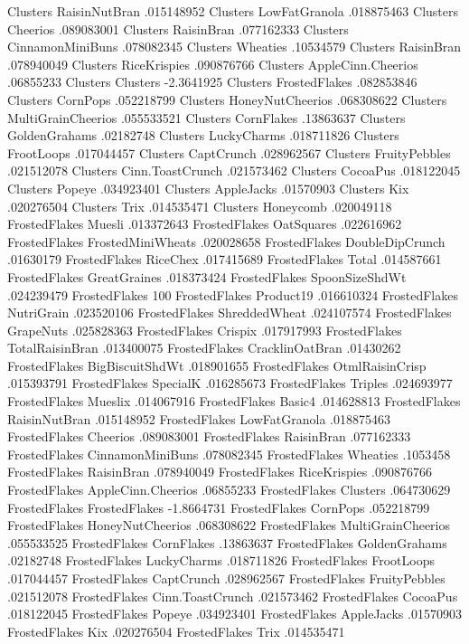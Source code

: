 Clusters	RaisinNutBran	.015148952
Clusters	LowFatGranola	.018875463
Clusters	Cheerios	.089083001
Clusters	RaisinBran	.077162333
Clusters	CinnamonMiniBuns	.078082345
Clusters	Wheaties	.10534579
Clusters	RaisinBran	.078940049
Clusters	RiceKrispies	.090876766
Clusters	AppleCinn.Cheerios	.06855233
Clusters	Clusters	-2.3641925
Clusters	FrostedFlakes	.082853846
Clusters	CornPops	.052218799
Clusters	HoneyNutCheerios	.068308622
Clusters	MultiGrainCheerios	.055533521
Clusters	CornFlakes	.13863637
Clusters	GoldenGrahams	.02182748
Clusters	LuckyCharms	.018711826
Clusters	FrootLoops	.017044457
Clusters	CaptCrunch	.028962567
Clusters	FruityPebbles	.021512078
Clusters	Cinn.ToastCrunch	.021573462
Clusters	CocoaPus	.018122045
Clusters	Popeye	.034923401
Clusters	AppleJacks	.01570903
Clusters	Kix	.020276504
Clusters	Trix	.014535471
Clusters	Honeycomb	.020049118
FrostedFlakes	Muesli	.013372643
FrostedFlakes	OatSquares	.022616962
FrostedFlakes	FrostedMiniWheats	.020028658
FrostedFlakes	DoubleDipCrunch	.01630179
FrostedFlakes	RiceChex	.017415689
FrostedFlakes	Total	.014587661
FrostedFlakes	GreatGraines	.018373424
FrostedFlakes	SpoonSizeShdWt	.024239479
FrostedFlakes	100%
FrostedFlakes	Product19	.016610324
FrostedFlakes	NutriGrain	.023520106
FrostedFlakes	ShreddedWheat	.024107574
FrostedFlakes	GrapeNuts	.025828363
FrostedFlakes	Crispix	.017917993
FrostedFlakes	TotalRaisinBran	.013400075
FrostedFlakes	CracklinOatBran	.01430262
FrostedFlakes	BigBiscuitShdWt	.018901655
FrostedFlakes	OtmlRaisinCrisp	.015393791
FrostedFlakes	SpecialK	.016285673
FrostedFlakes	Triples	.024693977
FrostedFlakes	Mueslix	.014067916
FrostedFlakes	Basic4	.014628813
FrostedFlakes	RaisinNutBran	.015148952
FrostedFlakes	LowFatGranola	.018875463
FrostedFlakes	Cheerios	.089083001
FrostedFlakes	RaisinBran	.077162333
FrostedFlakes	CinnamonMiniBuns	.078082345
FrostedFlakes	Wheaties	.1053458
FrostedFlakes	RaisinBran	.078940049
FrostedFlakes	RiceKrispies	.090876766
FrostedFlakes	AppleCinn.Cheerios	.06855233
FrostedFlakes	Clusters	.064730629
FrostedFlakes	FrostedFlakes	-1.8664731
FrostedFlakes	CornPops	.052218799
FrostedFlakes	HoneyNutCheerios	.068308622
FrostedFlakes	MultiGrainCheerios	.055533525
FrostedFlakes	CornFlakes	.13863637
FrostedFlakes	GoldenGrahams	.02182748
FrostedFlakes	LuckyCharms	.018711826
FrostedFlakes	FrootLoops	.017044457
FrostedFlakes	CaptCrunch	.028962567
FrostedFlakes	FruityPebbles	.021512078
FrostedFlakes	Cinn.ToastCrunch	.021573462
FrostedFlakes	CocoaPus	.018122045
FrostedFlakes	Popeye	.034923401
FrostedFlakes	AppleJacks	.01570903
FrostedFlakes	Kix	.020276504
FrostedFlakes	Trix	.014535471
